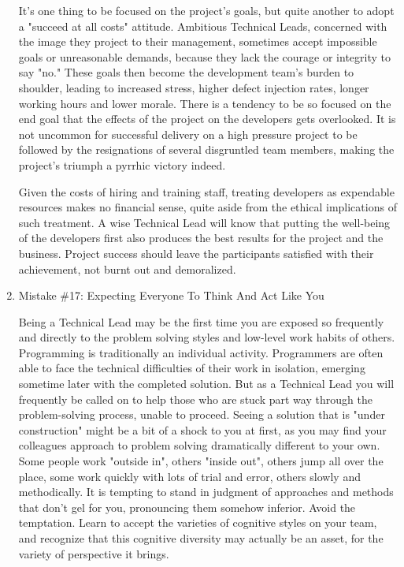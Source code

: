 \documentclass{article}
\begin{document}
\begin{enumerate}
It's one thing to be focused on the project's goals, but quite another
to adopt a "succeed at all costs" attitude. Ambitious Technical Leads,
concerned with the image they project to their management, sometimes
accept impossible goals or unreasonable demands, because they lack the
courage or integrity to say "no." These goals then become the
development team's burden to shoulder, leading to increased stress,
higher defect injection rates, longer working hours and lower morale.
There is a tendency to be so focused on the end goal that the effects of
the project on the developers gets overlooked. It is not uncommon for
successful delivery on a high pressure project to be followed by the
resignations of several disgruntled team members, making the project's
triumph a pyrrhic victory indeed.

Given the costs of hiring and training staff, treating developers as
expendable resources makes no financial sense, quite aside from the
ethical implications of such treatment. A wise Technical Lead will know
that putting the well-being of the developers first also produces the
best results for the project and the business. Project success should
leave the participants satisfied with their achievement, not burnt out
and demoralized.

\item Mistake \#17: Expecting Everyone To Think And Act Like You
\label{sec:orgheadline160}

Being a Technical Lead may be the first time you are exposed so
frequently and directly to the problem solving styles and low-level work
habits of others. Programming is traditionally an individual activity.
Programmers are often able to face the technical difficulties of their
work in isolation, emerging sometime later with the completed solution.
But as a Technical Lead you will frequently be called on to help those
who are stuck part way through the problem-solving process, unable to
proceed. Seeing a solution that is "under construction" might be a bit
of a shock to you at first, as you may find your colleagues approach to
problem solving dramatically different to your own. Some people work
"outside in", others "inside out", others jump all over the place, some
work quickly with lots of trial and error, others slowly and
methodically. It is tempting to stand in judgment of approaches and
methods that don't gel for you, pronouncing them somehow inferior. Avoid
the temptation. Learn to accept the varieties of cognitive styles on
your team, and recognize that this cognitive diversity may actually be
an asset, for the variety of perspective it brings.


\end{enumerate}
\end{document}
